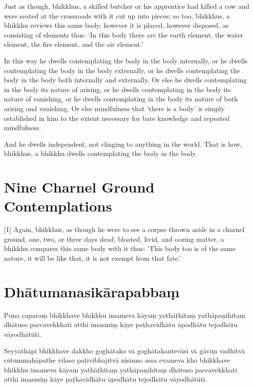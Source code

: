 Just as though, bhikkhus, a skilled butcher or his apprentice had killed a cow
and were seated at the crossroads with it cut up into pieces; so too, bhikkhus,
a bhikkhu reviews this same body, however it is placed, however disposed, as
consisting of elements thus: `In this body there are the earth element, the
water element, the fire element, and the air element.'

In this way he dwells contemplating the body in the body internally, or he
dwells contemplating the body in the body externally, or he dwells contemplating
the body in the body both internally and externally. Or else he dwells
contemplating in the body its nature of arising, or he dwells contemplating in
the body its nature of vanishing, or he dwells contemplating in the body its
nature of both arising and vanishing. Or else mindfulness that ‘there is a body’
is simply established in him to the extent necessary for bare knowledge and
repeated mindfulness.

And he dwells independent, not clinging to anything in the world. That is how,
bhikkhus, a bhikkhu dwells contemplating the body in the body.


\section{Nine Charnel Ground Contemplations}

[1] Again, bhikkhus, as though he were to see a corpse thrown aside in a charnel
ground, one, two, or three days dead, bloated, livid, and oozing matter, a
bhikkhu compares this same body with it thus: 'This body too is of the same
nature, it will be like that, it is not exempt from that fate.'

\paliPage
\section*{Dhātumanasikārapabbaṃ}

Puna caparaṃ bhikkhave bhikkhu imameva kāyaṃ yathāṭhitaṃ yathāpaṇihitaṃ dhātuso
paccavekkhati atthi imasmiṃ kāye paṭhavīdhātu āpodhātu tejodhātu vāyodhātūti.

Seyyathāpi bhikkhave dakkho goghātako vā goghātakantevāsī vā gāviṃ vadhitvā
cātummahāpathe vilaso paṭivibhajitvā nisinno assa evameva kho bhikkhave bhikkhu
imameva kāyaṃ yathāṭhitaṃ yathāpaṇihitaṃ dhātuso paccavekkhati atthi imasmiṃ
kāye paṭhavīdhātu āpodhātu tejodhātu vāyodhātūti.

